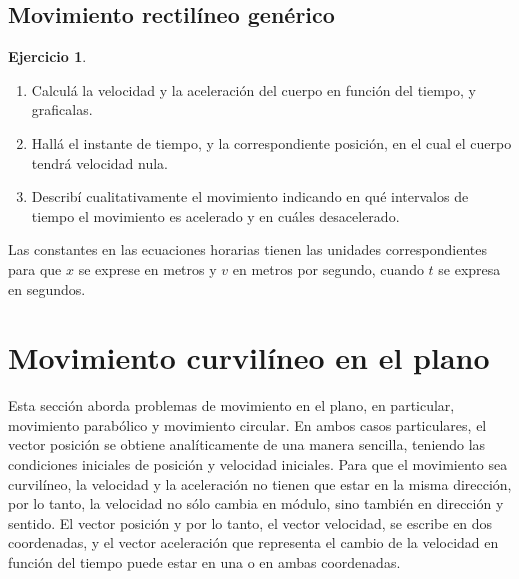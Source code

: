 \documentclass[a4paper,12pt,twoside]{book}
\newtheorem{ejercicio}{{Ejercicio}}[chapter]
\begin{document}
\subsection{Movimiento rectilíneo genérico}

\begin{mdframed}[style=ejercicio-intermedio]
    \begin{ejercicio}
    \end{ejercicio}
    \begin{enumerate}
        \item
        Calculá la velocidad y la aceleración del cuerpo en función del tiempo, y graficalas.
        \item
        Hallá el instante de tiempo, y la correspondiente posición, en el cual el cuerpo tendrá velocidad nula.
        \item
        Describí cualitativamente el movimiento indicando en qué intervalos de tiempo el movimiento es
        acelerado y en cuáles desacelerado.
    \end{enumerate}
    Las constantes en las ecuaciones horarias tienen las unidades correspondientes para que $x$ se exprese en metros y $v$ en metros por segundo, cuando $t$ se expresa en segundos.
\end{mdframed}


\section{Movimiento curvilíneo en el plano}

\begin{mdframed}[style=explicacion]
    Esta sección aborda problemas de movimiento en el plano, en particular, movimiento parabólico y movimiento circular.
    En ambos casos particulares, el vector posición se obtiene analíticamente de una manera sencilla, teniendo las condiciones iniciales de posición y velocidad iniciales.
    Para que el movimiento sea curvilíneo, la velocidad y la aceleración no tienen que estar en la misma dirección, por lo tanto, la velocidad no sólo cambia en módulo, sino también en dirección y sentido.
    El vector posición y por lo tanto, el vector velocidad, se escribe en dos coordenadas, y el vector aceleración que representa el cambio de la velocidad en función del tiempo puede estar en una o en ambas coordenadas.
\end{mdframed}
\end{document}

